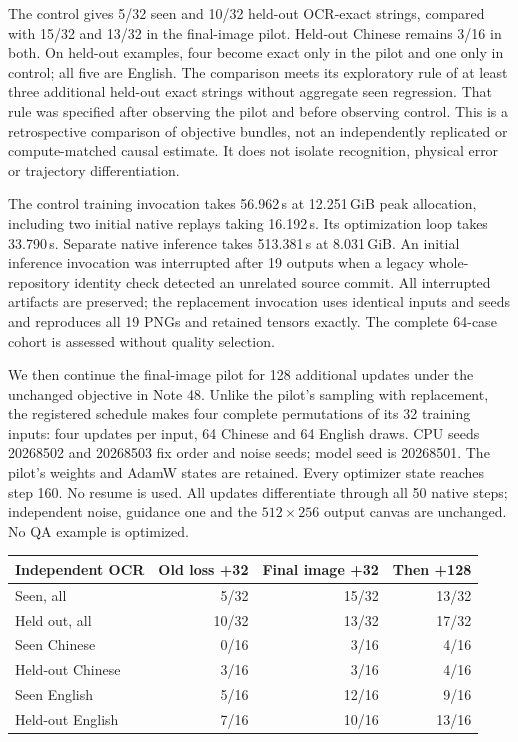 \documentclass[10pt,a4paper]{article}
\begin{document}
The control gives 5/32 seen and 10/32 held-out OCR-exact strings, compared
with 15/32 and 13/32 in the final-image pilot. Held-out Chinese remains 3/16
in both. On held-out examples, four become exact only in the pilot and one
only in control; all five are English. The comparison meets its exploratory
rule of at least three additional held-out exact strings without aggregate
seen regression. That rule was specified after observing the pilot and before
observing control. This is a retrospective comparison of objective bundles,
not an independently replicated or compute-matched causal estimate. It does
not isolate recognition, physical error or trajectory differentiation.

The control training invocation takes 56.962\,s at 12.251\,GiB peak allocation,
including two initial native replays taking 16.192\,s. Its optimization loop
takes 33.790\,s. Separate native inference takes 513.381\,s at 8.031\,GiB.
An initial inference invocation was interrupted after 19 outputs when a
legacy whole-repository identity check detected an unrelated source commit.
All interrupted artifacts are preserved; the replacement invocation uses
identical inputs and seeds and reproduces all 19 PNGs and retained tensors
exactly. The complete 64-case cohort is assessed without quality selection.

We then continue the final-image pilot for 128 additional updates under the
unchanged objective in Note 48. Unlike the pilot's sampling with replacement,
the registered schedule makes four complete permutations of its 32 training
inputs: four updates per input, 64 Chinese and 64 English draws. CPU seeds
20268502 and 20268503 fix order and noise seeds; model seed is 20268501.
The pilot's weights and AdamW states are retained. Every optimizer state
reaches step 160. No resume is used. All updates differentiate through all
50 native steps; independent noise, guidance one and the $512\times256$
output canvas are unchanged. No QA example is optimized.

\begin{center}\small
\begin{tabular}{lrrr}
\toprule
Independent OCR & Old loss +32 & Final image +32 & Then +128\\
\midrule
Seen, all & 5/32 & 15/32 & 13/32\\
Held out, all & 10/32 & 13/32 & 17/32\\
Seen Chinese & 0/16 & 3/16 & 4/16\\
Held-out Chinese & 3/16 & 3/16 & 4/16\\
Seen English & 5/16 & 12/16 & 9/16\\
Held-out English & 7/16 & 10/16 & 13/16\\
\bottomrule
\end{tabular}
\end{center}
\end{document}
